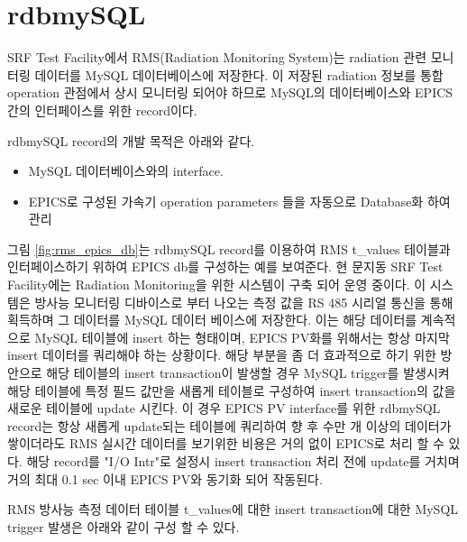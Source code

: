 \documentclass[11pt
  , a4paper
  , article
  , oneside
]{memoir}
\begin{document}
\chapter{rdbmySQL}
SRF Test Facility에서 RMS(Radiation Monitoring System)는 radiation 관련 모니터링 데이터를 MySQL 데이터베이스에 저장한다. 이 저장된 radiation 정보를 통합 operation 관점에서 상시 모니터링 되어야 하므로 MySQL의 데이터베이스와 EPICS간의 인터페이스를 위한 record이다.

rdbmySQL record의 개발 목적은 아래와 같다.
\begin{itemize}
	\item MySQL 데이터베이스와의 interface.
	\item EPICS로 구성된 가속기 operation parameters 들을 자동으로 Database화 하여 관리
\end{itemize}

그림 \ref{fig:rms_epics_db}는 rdbmySQL record를 이용하여 RMS t\_values 테이블과 인터페이스하기 위하여 EPICS db를 구성하는 예를 보여준다. 현 문지동 SRF Test Facility에는 Radiation Monitoring을 위한 시스템이 구축 되어 운영 중이다. 이 시스템은 방사능 모니터링 디바이스로 부터 나오는 측정 값을 RS 485 시리얼 통신을 통해 획득하며 그 데이터를 MySQL 데이터 베이스에 저장한다. 이는 해당 데이터를 계속적으로 MySQL 테이블에 insert 하는 형태이며, EPICS PV화를 위해서는 항상 마지막 insert 데이터를 쿼리해야 하는 상황이다. 해당 부분을 좀 더 효과적으로 하기 위한 방안으로 해당 테이블의 insert transaction이 발생할 경우 MySQL trigger를 발생시켜 해당 테이블에 특정 필드 값만을 새롭게 테이블로 구성하여 insert transaction의 값을 새로운 테이블에 update 시킨다. 이 경우 EPICS PV interface를 위한 rdbmySQL record는 항상 새롭게 update되는 테이블에 쿼리하여 향 후 수만 개 이상의 데이터가 쌓이더라도 RMS 실시간 데이터를 보기위한 비용은 거의 없이 EPICS로 처리 할 수 있다. 해당 record를 "I/O Intr"로 설정시 insert transaction 처리 전에 update를 거치며 거의 최대 0.1 sec 이내 EPICS PV와 동기화 되어 작동된다.

RMS 방사능 측정 데이터 테이블 t\_values에 대한 insert transaction에 대한 MySQL trigger 발생은 아래와 같이 구성 할 수 있다.
\end{document}
